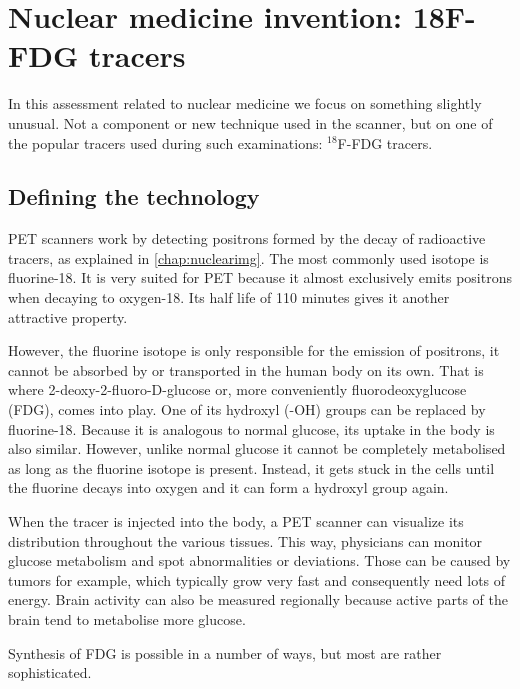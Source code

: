 \section{Nuclear medicine invention: 18F-FDG tracers}
In this assessment related to nuclear medicine we focus on something slightly
unusual. Not a component or new technique used in the scanner, but on one of the
popular tracers used during such examinations: $^{18}$F-FDG tracers.

\subsection{Defining the technology}
PET scanners work by detecting positrons formed by the decay of radioactive
tracers, as explained in \autoref{chap:nuclearimg}. The most commonly used
isotope is fluorine-18. It is very suited for PET because it almost exclusively
emits positrons when decaying to oxygen-18. Its half life of 110 minutes gives
it another attractive property.


However, the fluorine isotope is only responsible for the emission of positrons,
it cannot be absorbed by or transported in the human body on its own. That is
where 2-deoxy-2-fluoro-D-glucose or, more conveniently fluorodeoxyglucose (FDG),
comes into play. One of its hydroxyl (-OH) groups can be replaced by
fluorine-18. Because it is analogous to normal glucose, its uptake in the body
is also similar. However, unlike normal glucose it cannot be completely
metabolised as long as the fluorine isotope is present. Instead, it gets stuck
in the cells until the fluorine decays into oxygen and it can form a hydroxyl
group again.

When the tracer is injected into the body, a PET scanner can visualize its
distribution throughout the various tissues. This way, physicians can monitor
glucose metabolism and spot abnormalities or deviations. Those can be caused by
tumors for example, which typically grow very fast and consequently need lots of
energy. Brain activity can also be measured regionally because active parts of
the brain tend to metabolise more glucose.

Synthesis of FDG is possible in a number of ways, but most are rather
sophisticated. 



